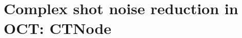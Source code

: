 \newpage
{}
\chapter{Complex shot noise reduction in OCT: CTN\lowercase{ode}}\label{chap:CTNode}

\iffalse
\section{SHARP: A CAO technique for OCT}

\subsection{Phase stability assessment}

\subsection{Description of the method}

\section{Proof of concept experimental validation}

\section{Extending SHARP}

\subsection{Motion artifacts correction}

\subsection{Spatially-varying aberrations correction}

\subsection{Complex amplitude noise reduction}
\fi